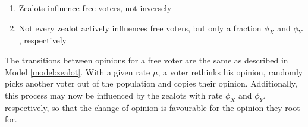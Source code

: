 \documentclass[12pt,a4paper,twoside]{article}
\begin{document}
\begin{enumerate}
	\item Zealots influence free voters, not inversely
	\item Not every zealot actively influences free voters, but only a fraction $\phi_X$ and $\phi_Y$, respectively
\end{enumerate}

The transitions between opinions for a free voter are the same as described in Model \ref{model:zealot}. With a given rate $\mu$, a voter rethinks his opinion, randomly picks another voter out of the population and copies their opinion. Additionally, this process may now be influenced by the zealots with rate $\phi_X$ and $\phi_Y$, respectively, so that the change of opinion is favourable for the opinion they root for.\newline
\end{document}
